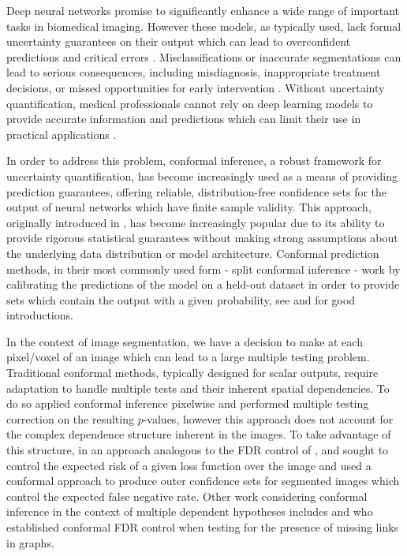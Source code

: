


Deep neural networks promise to significantly enhance a wide range of important tasks in biomedical imaging. However these models, as typically used, lack formal uncertainty guarantees on their output which can lead to overconfident predictions and critical errors \citep{Guo2017, Gupta2020}. Misclassifications or inaccurate segmentations can lead to serious consequences, including misdiagnosis, inappropriate treatment decisions, or missed opportunities for early intervention \citep{Topol2019}. Without uncertainty quantification, medical professionals cannot rely on deep learning models to provide accurate information and predictions which can limit their use in practical applications \citep{Jungo2020}. 

In order to address this problem, conformal inference, a robust framework for uncertainty quantification, has become increasingly used as a means of providing prediction guarantees, offering reliable, distribution-free confidence sets for the output of neural networks which have finite sample validity. This approach, originally introduced in \cite{Papadopoulos2002, Vovk2005}, has become increasingly popular due to its ability to provide rigorous statistical guarantees without making strong assumptions about the underlying data distribution or model architecture. Conformal prediction methods, in their most commonly used form - split conformal inference - work by calibrating the predictions of the model on a held-out dataset in order to provide sets which contain the output with a given probability, see \cite{Shafer2008} and \cite{Angelopoulos2021} for good introductions.

In the context of image segmentation, we have a decision to make at each pixel/voxel of an image which can lead to a large multiple testing problem. Traditional conformal methods, typically designed for scalar outputs, require adaptation to handle multiple tests and their inherent spatial dependencies. To do so \cite{Angelopoulos2021LTT} applied conformal inference pixelwise and performed multiple testing correction on the resulting $p$-values, however this approach does not account for the complex dependence structure inherent in the images. To take advantage of this structure, in an approach analogous to the FDR control of \citep{Benjamini1995}, \cite{Bates2021} and \cite{Angelopoulos2022} sought to control the expected risk of a given loss function over the image and used a conformal approach to produce outer confidence sets for segmented images which control the expected false negative rate. Other work considering conformal inference in the context of multiple dependent hypotheses includes \cite{Marandon2024} and \cite{Blanchard2024} who established conformal FDR control when testing for the presence of missing links in graphs.

